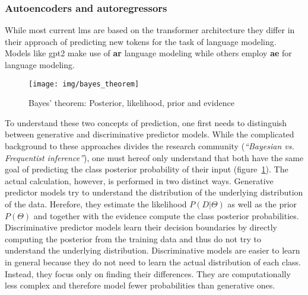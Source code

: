 \subsubsection{Autoencoders and autoregressors}
\label{sub:autoencoders_and_autoregressors}

While most current \gls{lm}s are based on the transformer architecture they differ in their approach of predicting new tokens for the task of language modeling. Models like \gls{gpt2} make use of \textbf{\gls{ar}} language modeling while others employ \textbf{\gls{ae}} for language modeling.

\begin{figure}
	\texttt{[image: img/bayes\_theorem]}
	\caption{Bayes' theorem: Posterior, likelihood, prior and evidence}
	\label{fig:bayes_theorem}
\end{figure}

To understand these two concepts of prediction, one first needs to distinguish between generative and discriminative predictor models. While the complicated background to these approaches divides the research community (\textit{``Bayesian vs. Frequentist inference''}), one must hereof only understand that both have the same goal of predicting the class posterior probability of their input (figure~\ref{fig:bayes_theorem}). The actual calculation, however, is performed in two distinct ways. Generative predictor models try to understand the distribution of the underlying distribution of the data. Herefore, they estimate the likelihood $ P(D|\Theta) $ as well as the prior $ P(\Theta) $ and together with the evidence compute the class posterior probabilities. Discriminative predictor models learn their decision boundaries by directly computing the posterior from the training data and thus do not try to understand the underlying distribution. Discriminative models are easier to learn in general because they do not need to learn the actual distribution of each class. Instead, they focus only on finding their differences. They are computationally less complex and therefore model fewer probabilities than generative ones.

